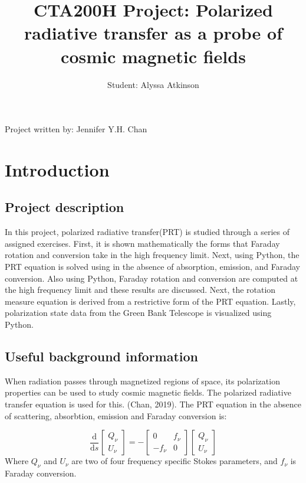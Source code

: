 \documentclass[apj]{emulateapj}
\begin{document}
\title{CTA200H Project: 
Polarized radiative transfer as a probe of cosmic magnetic fields
}
 
\author{Student: Alyssa Atkinson}{Project written by: Jennifer Y.H. Chan}
 




\section{Introduction}
\subsection{Project description}
In this project, polarized radiative transfer(PRT) is studied through a series of assigned exercises. First, it is shown mathematically the forms that Faraday rotation and conversion take in the high frequency limit. Next, using Python, the PRT equation is solved using in the absence of absorption, emission, and Faraday conversion. Also using Python, Faraday rotation and conversion are computed at the high frequency limit and these results are discussed. Next, the rotation measure equation is derived from a restrictive form of the PRT equation. Lastly, polarization state data from the Green Bank Telescope is visualized using Python.
\\

\subsection{Useful background information}
When radiation passes through magnetized regions of space, its polarization properties can be used to study cosmic magnetic fields.  The polarized radiative transfer equation is used for this. (Chan, 2019). The PRT equation in the absence of scattering, absorbtion, emission and Faraday conversion is: 

\begin{equation}\label{eq:test}
\frac{\mathrm{d}}{\mathrm{d} s}\left[\begin{array}{l}
Q_\nu \\
U_\nu
\end{array}\right]=-\left[\begin{array}{cc}
0 & f_\nu \\
-f_\nu & 0
\end{array}\right]\left[\begin{array}{l}
Q_\nu \\
U_\nu
\end{array}\right]
\end{equation}
Where ${Q_\nu}$ and ${U_\nu}$ are two of four frequency specific Stokes parameters, and $f_\nu$ is Faraday conversion. 
\end{document}
